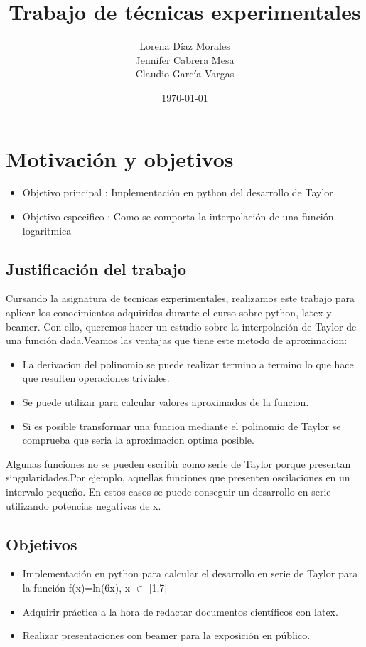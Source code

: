 \documentclass[a4paper,12pt]{report}
\title{Trabajo de técnicas experimentales}
\author{Lorena Díaz Morales\\ Jennifer Cabrera Mesa\\ Claudio García Vargas}
\date{\today}
\begin{document}
\begin{titlepage}
\maketitle 
\end{titlepage}
\tableofcontents
\listoftables
\listoffigures
\chapter{Motivación y objetivos}
\begin{itemize}
 \item
    Objetivo principal : Implementación en python del desarrollo de Taylor
 \item
    Objetivo especifico : Como se comporta la interpolación de una función logaritmica
\end{itemize}
\section{Justificación del trabajo}
Cursando la asignatura de tecnicas experimentales, realizamos este trabajo para aplicar los conocimientos adquiridos
durante el curso sobre python, latex y beamer. Con ello, queremos hacer un estudio sobre la interpolación
de Taylor de una función dada.Veamos las ventajas que tiene este metodo de aproximacion:
\begin{itemize}
 \item 
    La derivacion del polinomio se puede realizar termino a termino lo que hace que resulten operaciones triviales. 
 \item
    Se puede utilizar para calcular valores aproximados de la funcion.
 \item
    Si es posible transformar una funcion mediante el polinomio de Taylor se comprueba que seria la aproximacion optima posible. 
\end{itemize}

Algunas funciones no se pueden escribir como serie de Taylor porque presentan singularidades.Por ejemplo, aquellas funciones que presenten oscilaciones en un intervalo pequeño.
En estos casos se puede conseguir un desarrollo en serie utilizando potencias negativas de x.

  
\section{Objetivos}
\begin{itemize}
 \item 
    Implementación en python para calcular el desarrollo en serie de Taylor para la función f(x)=ln(6x), x $\in$ [1,7]
 \item
    Adquirir práctica a la hora de redactar documentos científicos con latex.
 \item
    Realizar presentaciones con beamer para la exposición en público.
 
\end{itemize}
\end{document}
